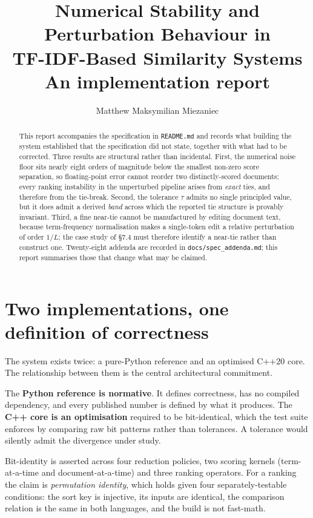 \documentclass[11pt,a4paper]{article}
\title{Numerical Stability and Perturbation Behaviour in\\
       TF-IDF-Based Similarity Systems\\[0.4em]
       \large An implementation report}
\author{Matthew Maksymilian Miezaniec}
\date{}
\theoremstyle{plain} \newtheorem{proposition}{Proposition} \theoremstyle{remark}
\newcommand{\code}[1]{\texttt{\small #1}}
\begin{document}
\maketitle

\begin{abstract}
This report accompanies the specification in \code{README.md} and records what
building the system established that the specification did not state, together
with what had to be corrected. Three results are structural rather than
incidental. First, the numerical noise floor sits nearly eight orders of
magnitude below the smallest non-zero score separation, so floating-point error
cannot reorder two distinctly-scored documents; every ranking instability in the
unperturbed pipeline arises from \emph{exact} ties, and therefore from the
tie-break. Second, the tolerance $\tau$ admits no single principled value, but it
does admit a derived \emph{band} across which the reported tie structure is
provably invariant. Third, a fine near-tie cannot be manufactured by editing
document text, because term-frequency normalisation makes a single-token edit a
relative perturbation of order $1/L$; the case study of \S7.4 must therefore
identify a near-tie rather than construct one. Twenty-eight addenda are recorded
in \code{docs/spec\_addenda.md}; this report summarises those that change what
may be claimed.
\end{abstract}

\section{Two implementations, one definition of correctness}

The system exists twice: a pure-Python reference and an optimised C++20 core.
The relationship between them is the central architectural commitment.

The \textbf{Python reference is normative}. It defines correctness, has no
compiled dependency, and every published number is defined by what it produces.
The \textbf{C++ core is an optimisation} required to be bit-identical, which the
test suite enforces by comparing raw bit patterns rather than tolerances. A
tolerance would silently admit the divergence under study.

Bit-identity is asserted across four reduction policies, two scoring kernels
(term-at-a-time and document-at-a-time) and three ranking operators. For a
ranking the claim is \emph{permutation identity}, which holds given four
separately-testable conditions: the sort key is injective, its inputs are
identical, the comparison relation is the same in both languages, and the build
is not fast-math.
\end{document}
